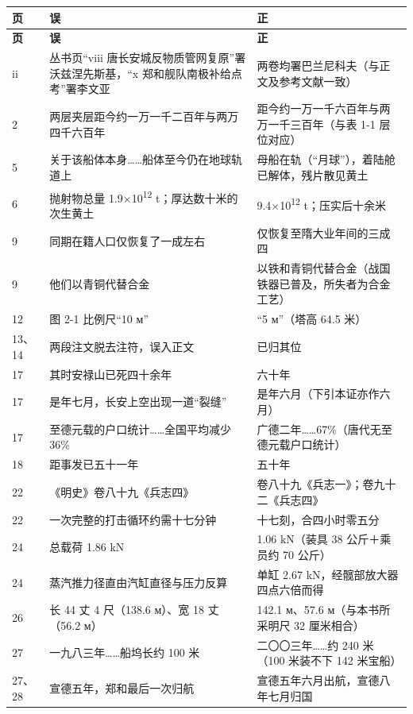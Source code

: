 \vspace{4mm}
{\footnotesize
\renewcommand{\arraystretch}{1.22}
\begin{longtable}{@{}p{17mm}p{58mm}p{58mm}@{}}
\toprule
\textbf{页} & \textbf{误} & \textbf{正}\\
\midrule
\endfirsthead
\toprule
\textbf{页} & \textbf{误} & \textbf{正}\\
\midrule
\endhead
\bottomrule
\endfoot
ii & 丛书页“viii 唐长安城反物质管网复原”署沃兹涅先斯基，“x 郑和舰队南极补给点考”署李文亚 & 两卷均署巴兰尼科夫（与正文及参考文献一致）\\
2 & 两层夹层距今约一万一千二百年与两万四千六百年 & 距今约一万一千六百年与两万一千三百年（与表 1-1 层位对应）\\
5 & 关于该船体本身……船体至今仍在地球轨道上 & 母船在轨（“月球”），着陆舱已解体，残片散见黄土\\
6 & 抛射物总量 1.9×10\textsuperscript{12} t；厚达数十米的次生黄土 & 9.4×10\textsuperscript{12} t；压实后十余米\\
9 & 同期在籍人口仅恢复了一成左右 & 仅恢复至隋大业年间的三成四\\
9 & 他们以青铜代替合金 & 以铁和青铜代替合金（战国铁器已普及，所失者为合金工艺）\\
12 & 图 2-1 比例尺“10 м” & “5 м”（塔高 64.5 米）\\
13、14 & 两段注文脱去注符，误入正文 & 已归其位\\
17 & 其时安禄山已死四十余年 & 六十年\\
17 & 是年七月，长安上空出现一道“裂缝” & 是年六月（下引本证亦作六月）\\
17 & 至德元载的户口统计……全国平均减少 36\% & 广德二年……67\%（唐代无至德元载户口统计）\\
18 & 距事发已五十一年 & 五十年\\
22 & 《明史》卷八十九《兵志四》 & 卷八十九《兵志一》；卷九十二《兵志四》\\
22 & 一次完整的打击循环约需十七分钟 & 十七刻，合四小时零五分\\
24 & 总载荷 1.86 kN & 1.06 kN（装具 38 公斤＋乘员约 70 公斤）\\
24 & 蒸汽推力径直由汽缸直径与压力反算 & 单缸 2.67 kN，经髋部放大器四点六倍而得\\
26 & 长 44 丈 4 尺（138.6 м）、宽 18 丈（56.2 м） & 142.1 м、57.6 м（与本书所采明尺 32 厘米相合）\\
27 & 一九八三年……船坞长约 100 米 & 二〇〇三年……约 240 米（100 米装不下 142 米宝船）\\
27、28 & 宣德五年，郑和最后一次归航 & 宣德五年六月出航，宣德八年七月归国\\

\end{longtable}}
